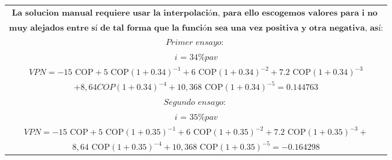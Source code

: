 \begin{center}
\begin{longtable}{|c|c|c|}
        \multicolumn{3}{|c|}{$\textbf{La solucion manual requiere usar la interpolación, para ello escogemos valores para i no }  $}                                                                                                  \\
        \multicolumn{3}{|c|}{$ \textbf{muy alejados entre sí de tal forma que la función sea una vez positiva y otra negativa, así:}$}                                                                                                \\
        \multicolumn{3}{|c|}{$ \textit{Primer ensayo: }$}                                                                                                                                                                             \\
        \multicolumn{3}{|c|}{$ \textit{i = 34\% pav}$}                                                                                                                                                                                \\
        \multicolumn{3}{|c|}{$ VPN = -15\text{ COP} + 5\text{ COP}(1+0.34)^{-1} + 6\text{ COP}(1+0.34)^{-2} + 7.2\text{ COP}(1+0.34)^{-3}$}                                                                                           \\
        \multicolumn{3}{|c|}{$+8,64COP(1+0.34)^{-4} + 10,368\text{ COP}(1+0.34)^{-5}=0.144763$}                                                                                                                                       \\
        \multicolumn{3}{|c|}{$ \textit{Segundo ensayo: }$}                                                                                                                                                                            \\
        \multicolumn{3}{|c|}{$ \textit{i = 35\% pav}$}                                                                                                                                                                                \\
        \multicolumn{3}{|c|}{$ VPN = -15\text{ COP} + 5\text{ COP}(1+0.35)^{-1} + 6\text{ COP}(1+0.35)^{-2} + 7.2\text{ COP}(1+0.35)^{-3} +$}                                                                                         \\
        \multicolumn{3}{|c|}{$8,64\text{ COP}(1+0.35)^{-4} + 10,368\text{ COP}(1+0.35)^{-5} = -0.164298$}                                                                                                                             \\

\end{longtable}
\end{center}
